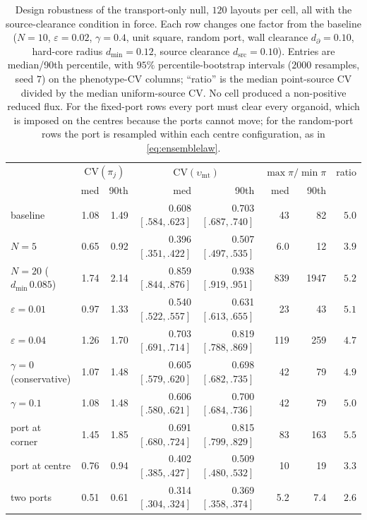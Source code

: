 \documentclass[pdflatex,sn-mathphys-num]{sn-jnl}
\numberwithin{equation}{section}
\theoremstyle{thmstyleone}%
\theoremstyle{definition}
\theoremstyle{remark}
\begin{document}
\begin{table}[htbp]\centering\small
\caption{Design robustness of the transport-only null, $120$ layouts per cell,
all with the source-clearance condition in force. Each row changes one factor
from the baseline ($N=10$, $\varepsilon=0.02$, $\gamma=0.4$, unit square, random
port, wall clearance $d_\partial=0.10$, hard-core radius $d_{\min}=0.12$,
source clearance $d_{\mathrm{src}}=0.10$). Entries are median/90th percentile,
with $95\%$ percentile-bootstrap intervals ($2000$ resamples, seed $7$) on the
phenotype-CV columns; ``ratio'' is the median point-source CV divided by the
median uniform-source CV. No cell produced a non-positive reduced flux. For the
fixed-port rows every
port must clear every organoid, which is imposed on the centres because the
ports cannot move; for the random-port rows the port is resampled within each
centre configuration, as in \eqref{eq:ensemblelaw}.}
\label{tab:nullsweep}
\begin{tabular}{@{}l|rr|rr|rr|r@{}}
\toprule
&\multicolumn{2}{c|}{$\mathrm{CV}(\pi_j)$}
&\multicolumn{2}{c|}{$\mathrm{CV}(\upsilon_{\mathrm{mt}})$}
&\multicolumn{2}{c|}{$\max\pi/\min\pi$}&ratio\\
&med&90th&med&90th&med&90th&\\
\midrule
baseline&1.08&1.49&0.608 \tiny$[.584,.623]$&0.703 \tiny$[.687,.740]$&43&82&$5.0$\\
\midrule
$N=5$&0.65&0.92&0.396 \tiny$[.351,.422]$&0.507 \tiny$[.497,.535]$&6.0&12&$3.9$\\
$N=20$ ($d_{\min}\,0.085$)&1.74&2.14&0.859 \tiny$[.844,.876]$&0.938 \tiny$[.919,.951]$&839&1947&$5.2$\\
\midrule
$\varepsilon=0.01$&0.97&1.33&0.540 \tiny$[.522,.557]$&0.631 \tiny$[.613,.655]$&23&43&$5.1$\\
$\varepsilon=0.04$&1.26&1.70&0.703 \tiny$[.691,.714]$&0.819 \tiny$[.788,.869]$&119&259&$4.7$\\
\midrule
$\gamma=0$ (conservative)&1.07&1.48&0.605 \tiny$[.579,.620]$&0.698 \tiny$[.682,.735]$&42&79&$4.9$\\
$\gamma=0.1$&1.08&1.48&0.606 \tiny$[.580,.621]$&0.700 \tiny$[.684,.736]$&42&79&$5.0$\\
\midrule
port at corner&1.45&1.85&0.691 \tiny$[.680,.724]$&0.815 \tiny$[.799,.829]$&83&163&$5.5$\\
port at centre&0.76&0.94&0.402 \tiny$[.385,.427]$&0.509 \tiny$[.480,.532]$&10&19&$3.3$\\
two ports&0.51&0.61&0.314 \tiny$[.304,.324]$&0.369 \tiny$[.358,.374]$&5.2&7.4&$2.6$\\

\end{tabular}
\end{table}
\end{document}
